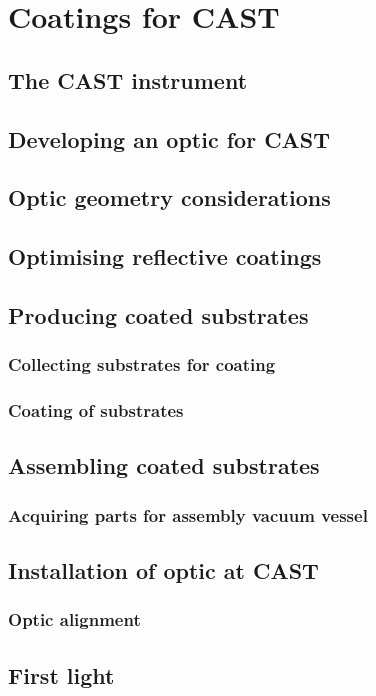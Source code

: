 \chapter{Coatings for CAST}

\section{The CAST instrument}



\section{Developing an optic for CAST}

\section{Optic geometry considerations}


\section{Optimising reflective coatings}


\section{Producing coated substrates}


\subsection{Collecting substrates for coating}

\subsection{Coating of substrates}



\section{Assembling coated substrates}


\subsection{Acquiring parts for assembly vacuum vessel}


\section{Installation of optic at CAST}


\subsection{Optic alignment}


\section{First light}
